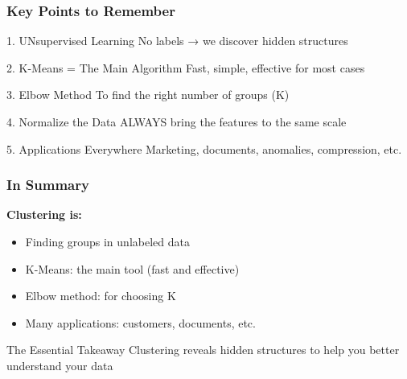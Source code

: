 \documentclass{beamer}
\begin{document}

\begin{frame}
\frametitle{Key Points to Remember}
\begin{block}{1. UNsupervised Learning}
No labels → we discover hidden structures
\end{block}

\vspace{0.5em}
\begin{block}{2. K-Means = The Main Algorithm}
Fast, simple, effective for most cases
\end{block}

\vspace{0.5em}
\begin{block}{3. Elbow Method}
To find the right number of groups (K)
\end{block}

\vspace{0.5em}
\begin{block}{4. Normalize the Data}
ALWAYS bring the features to the same scale
\end{block}

\vspace{0.5em}
\begin{block}{5. Applications Everywhere}
Marketing, documents, anomalies, compression, etc.
\end{block}
\end{frame}


\begin{frame}
\frametitle{In Summary}
\textbf{Clustering is:}
\begin{itemize}
    \item Finding groups in unlabeled data
    \item K-Means: the main tool (fast and effective)
    \item Elbow method: for choosing K
    \item Many applications: customers, documents, etc.
\end{itemize}

\vspace{2em}
\begin{alertblock}{The Essential Takeaway}
Clustering reveals hidden structures to help you better understand your data
\end{alertblock}
\end{frame}
\end{document}
